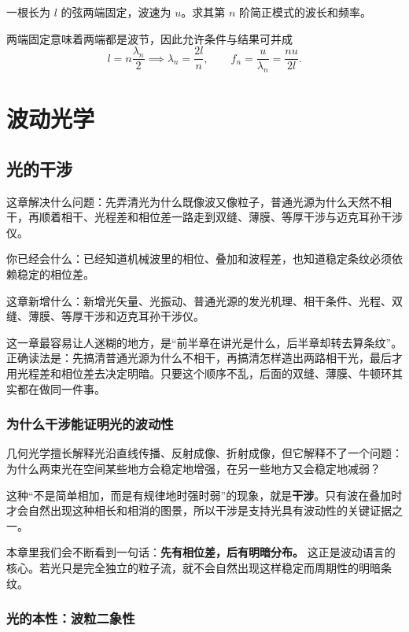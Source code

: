 \documentclass[lang=cn,11pt]{elegantbook}
\newcommand{\bridge}[1]{\begin{note}#1\end{note}}
\newcommand{\chapterroadmap}[3]{%
\begin{introduction}
  \item {\heiti 这章解决什么问题：}#1
  \item {\heiti 你已经会什么：}#2
  \item {\heiti 这章新增什么：}#3
\end{introduction}}
\begin{document}
\begin{exercise}[]
一根长为 \(l\) 的弦两端固定，波速为 \(u\)。求其第 \(n\) 阶简正模式的波长和频率。
\end{exercise}

\begin{solution}
两端固定意味着两端都是波节，因此允许条件与结果可并成
\[
l=n\frac{\lambda_n}{2}
\implies
\lambda_n=\frac{2l}{n},\qquad
f_n=\frac{u}{\lambda_n}=\frac{nu}{2l}.
\]
\end{solution}

\part{波动光学}

\chapter{光的干涉}

\chapterroadmap
{先弄清光为什么既像波又像粒子，普通光源为什么天然不相干，再顺着相干、光程差和相位差一路走到双缝、薄膜、等厚干涉与迈克耳孙干涉仪。}
{已经知道机械波里的相位、叠加和波程差，也知道稳定条纹必须依赖稳定的相位差。}
{新增光矢量、光振动、普通光源的发光机理、相干条件、光程、双缝、薄膜、等厚干涉和迈克耳孙干涉仪。}

\bridge{这一章最容易让人迷糊的地方，是“前半章在讲光是什么，后半章却转去算条纹”。正确读法是：先搞清普通光源为什么不相干，再搞清怎样造出两路相干光，最后才用光程差和相位差去决定明暗。只要这个顺序不乱，后面的双缝、薄膜、牛顿环其实都在做同一件事。}

\section{为什么干涉能证明光的波动性}

几何光学擅长解释光沿直线传播、反射成像、折射成像，但它解释不了一个问题：为什么两束光在空间某些地方会稳定地增强，在另一些地方又会稳定地减弱？

这种“不是简单相加，而是有规律地时强时弱”的现象，就是\textbf{干涉}。只有波在叠加时才会自然出现这种相长和相消的图景，所以干涉是支持光具有波动性的关键证据之一。

\begin{note}
本章里我们会不断看到一句话：\textbf{先有相位差，后有明暗分布。} 这正是波动语言的核心。若光只是完全独立的粒子流，就不会自然出现这样稳定而周期性的明暗条纹。
\end{note}

\section{光的本性：波粒二象性}
\end{document}
